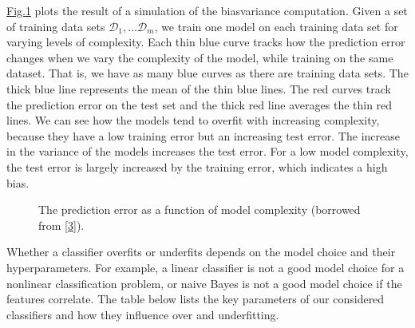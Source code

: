 \documentclass[letterpaper,10pt,english]{jupyterBook}
\let\sphinxpxdimen\pdfpxdimen\else\newdimen\sphinxpxdimen
\begin{document}
\sphinxAtStartPar
\hyperref[\detokenize{classification_evaluation:bias-variance-tradeoff1b-fig}]{Fig.\@ \ref{\detokenize{classification_evaluation:bias-variance-tradeoff1b-fig}}} plots the result of a simulation of the bias\sphinxhyphen{}variance computation. Given a set of training data sets \(\mathcal{D}_1,\ldots \mathcal{D}_m\), we train one model on each training data set for varying levels of complexity. Each thin blue curve tracks how the prediction error changes when we vary the complexity of the model, while training on the same dataset. That is, we have as many blue curves as there are training data sets. The thick blue line represents the mean of the thin blue lines. The red curves track the prediction error on the test set and the thick red line averages the thin red lines. We can see how the models tend to overfit with increasing complexity, because they have a low training error but an increasing test error. The increase in the variance of the models increases the test error. For a low model complexity, the test error is largely increased by the training error, which indicates a high bias.

\begin{figure}[htbp]
\centering
\capstart

\noindent\sphinxincludegraphics[height=320\sphinxpxdimen]{{e2}.png}
\caption{The prediction error as a function of model complexity (borrowed from {[}\hyperlink{cite.bibliography:id9}{3}{]}).}\label{\detokenize{classification_evaluation:bias-variance-tradeoff1b-fig}}\end{figure}

\sphinxAtStartPar
Whether a classifier overfits or underfits depends on the model choice and their hyperparameters. For example, a linear classifier is not a good model choice for a nonlinear classification problem, or naive Bayes is not a good model choice if the features correlate. The table below lists the key parameters of our considered classifiers and how they influence over\sphinxhyphen{} and underfitting.
\end{document}
